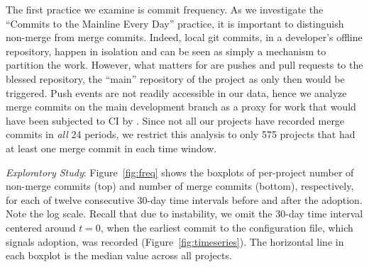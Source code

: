 The first practice we examine is commit frequency.
As we investigate the ``Commits to the Mainline Every Day'' practice, it is
important to distinguish non-merge from merge commits.
Indeed, local git commits, in a developer's offline repository, happen in 
isolation and can be seen as simply a mechanism to partition the work.
However, what matters for \Tvis are pushes and pull requests to the blessed 
\GH repository, \ie the ``main'' repository of the project as only then \Tvi would be triggered.
Push events are not readily accessible in our data, hence we analyze 
merge commits on the main development branch as a proxy for work
that would have been subjected to CI by \Tvi.
Since not all our projects have recorded merge commits in \emph{all} 24 
periods, we restrict this analysis to only 575 projects that had at least one 
merge commit in each time window.




%

\smallskip\noindent \emph{Exploratory Study}: 
Figure~\ref{fig:freq} shows the boxplots of per-project number of non-merge 
commits (top) and number of merge commits (bottom), respectively, for each
of twelve consecutive 30-day time intervals before and after the \Tvis adoption.
Note the log scale.
Recall that due to instability, we omit the 30-day time interval centered 
around $t = 0$, when the earliest commit to the \Tvi configuration file, which 
signals adoption, was recorded (Figure~\ref{fig:timeseries}).
The horizontal line in each boxplot is the median value across all projects.

